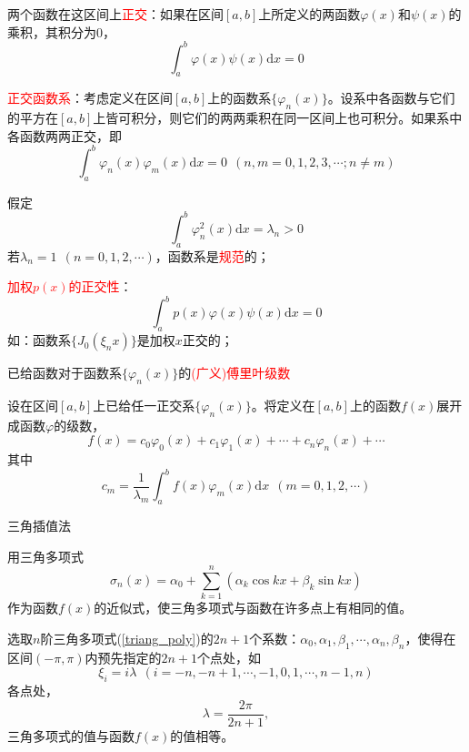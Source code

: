 \documentclass[12pt,a4paper]{article}
\newcommand{\dif}{\mathrm{d}}
\begin{document}
两个函数在这区间上\textcolor{red}{正交}：如果在区间$[a,b]$上所定义的两函数$\varphi(x)$和$\psi(x)$的乘积，其积分为$0$，
\begin{equation}
\int_{a}^{b} \varphi(x) \psi(x) \dif x = 0
\end{equation}

\textcolor{red}{正交函数系}：考虑定义在区间$[a,b]$上的函数系$\{\varphi_n(x) \}$。设系中各函数与它们的平方在$[a,b]$上皆可积分，则它们的两两乘积在同一区间上也可积分。如果系中各函数两两正交，即
\begin{equation}
\int_{a}^{b} \varphi_n(x) \varphi_m(x) \dif x = 0 ~~(n,m = 0,1,2,3,\cdots; n\neq m)
\end{equation}

假定
\begin{equation}
\int_{a}^{b} \varphi^2_n(x) \dif x = \lambda_n > 0
\end{equation}
若$\lambda_n = 1~~(n = 0,1,2,\cdots)$，函数系是\textcolor{red}{规范}的；

\textcolor{red}{加权$p(x)$的正交性}：
\begin{equation}
\int_{a}^{b} p(x) \varphi(x) \psi(x) \dif x = 0
\end{equation}
如：函数系$\{J_0(\xi_n x)\}$是加权$x$正交的；

已给函数对于函数系$\{\varphi_n(x)\}$的\textcolor{red}{(广义)傅里叶级数}

设在区间$[a,b]$上已给任一正交系$\{\varphi_n(x)\}$。将定义在$[a,b]$上的函数$f(x)$展开成函数$\varphi$的级数，
\begin{equation}
f(x) = c_0 \varphi_0(x) +c_1 \varphi_1(x) +\cdots +c_n \varphi_n(x) +\cdots 
\end{equation}
其中
\begin{equation}
c_m = \frac{1}{\lambda_m} \int_a^b f(x) \varphi_m(x) \dif x ~~(m = 0,1,2,\cdots)
\end{equation}

三角插值法

用三角多项式
\begin{equation}
\sigma_n(x) = \alpha_0 + \sum_{k=1}^{n} (\alpha_k \cos kx +\beta_k \sin kx)
\label{triang_poly}
\end{equation}
作为函数$f(x)$的近似式，使三角多项式与函数在许多点上有相同的值。

选取$n$阶三角多项式(\ref{triang_poly})的$2n+1$个系数：$\alpha_0,\alpha_1,\beta_1,\cdots,\alpha_n,\beta_n$，使得在区间$(-\pi,\pi)$内预先指定的$2n+1$个点处，如
\begin{equation}
\xi_i = i \lambda ~~(i = -n, -n+1, \cdots, -1, 0, 1, \cdots, n-1, n)
\end{equation}
各点处，
\begin{equation}
 \lambda = \frac{2\pi}{2n+1},
\end{equation}
三角多项式的值与函数$f(x)$的值相等。
\end{document}
